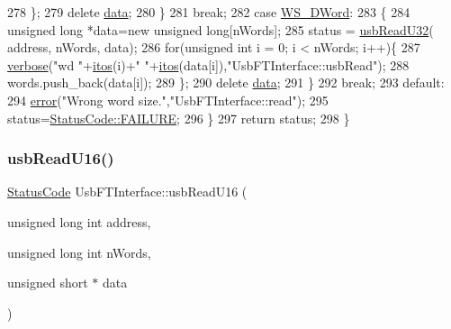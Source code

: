 \begin{DoxyCode}
278       \};
279       \textcolor{keyword}{delete} \hyperlink{namespaceshell_a5ea2525995cedc3efd69ea8a7f034d1e}{data};
280     \}
281     \textcolor{keywordflow}{break};
282   \textcolor{keywordflow}{case} \hyperlink{classUsbFTInterface_a057387f452eaac094fb77ba09cf1cf2eae8012559bbaaae91ac6208ed7b3ffe89}{WS\_DWord}:
283     \{
284       \textcolor{keywordtype}{unsigned} \textcolor{keywordtype}{long} *data=\textcolor{keyword}{new} \textcolor{keywordtype}{unsigned} \textcolor{keywordtype}{long}[nWords];
285       status = \hyperlink{classUsbFTInterface_a7eadb8a94323fada4c72ed1c992792cc}{usbReadU32}( address, nWords, data);
286       \textcolor{keywordflow}{for}(\textcolor{keywordtype}{unsigned} \textcolor{keywordtype}{int} i = 0; i < nWords; i++)\{
287         \hyperlink{classObject_a83d2db2df682907ea1115ad721c1c4a1}{verbose}(\textcolor{stringliteral}{"wd "}+\hyperlink{Tools_8h_af330027dbdafb9a30768b3613c553e60}{itos}(i)+\textcolor{stringliteral}{" "}+\hyperlink{Tools_8h_af330027dbdafb9a30768b3613c553e60}{itos}(data[i]),\textcolor{stringliteral}{"UsbFTInterface::usbRead"});
288         words.push\_back(data[i]);
289       \};
290       \textcolor{keyword}{delete} \hyperlink{namespaceshell_a5ea2525995cedc3efd69ea8a7f034d1e}{data};
291     \}
292     \textcolor{keywordflow}{break};
293   \textcolor{keywordflow}{default}:
294     \hyperlink{classObject_a204a95f57818c0f811933917a30eff45}{error}(\textcolor{stringliteral}{"Wrong word size."},\textcolor{stringliteral}{"UsbFTInterface::read"});
295     status=\hyperlink{classStatusCode_a6f565cbeadc76d14c72f047e5e85eb4ba3da73d4c469762eb9d3c960368252b26}{StatusCode::FAILURE};
296   \}
297   \textcolor{keywordflow}{return} status;
298 \}
\end{DoxyCode}
\mbox{\label{classUsbFTInterface_ae17381a2ca14b9acac9faa10c3e430db}} 
\subsubsection{\texorpdfstring{usb\+Read\+U16()}{usbReadU16()}}
{\footnotesize\ttfamily \hyperlink{classStatusCode}{Status\+Code} Usb\+F\+T\+Interface\+::usb\+Read\+U16 (\begin{DoxyParamCaption}\item[{unsigned long int}]{address,  }\item[{unsigned long int}]{n\+Words,  }\item[{unsigned short $\ast$}]{data }\end{DoxyParamCaption})}



